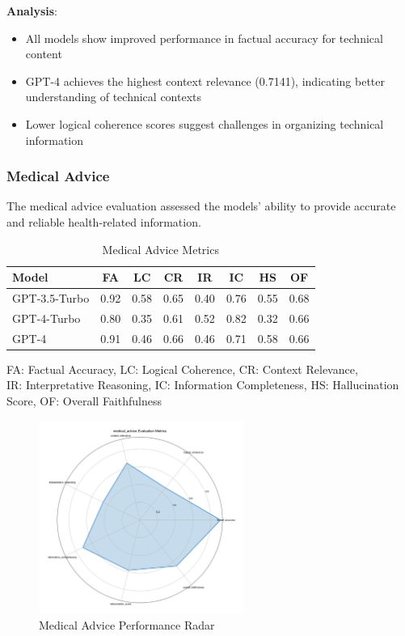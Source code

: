 \textbf{Analysis}:
\begin{itemize}
    \item All models show improved performance in factual accuracy for technical content
    \item GPT-4 achieves the highest context relevance (0.7141), indicating better understanding of technical contexts
    \item Lower logical coherence scores suggest challenges in organizing technical information
\end{itemize}

\subsubsection{Medical Advice}
The medical advice evaluation assessed the models' ability to provide accurate and reliable health-related information.

\begin{table}[!htbp]
\centering
\setlength{\tabcolsep}{4pt}  %
\begin{tabular}{|l|c|c|c|c|c|c|c|}
\hline
\textbf{Model} & \textbf{FA} & \textbf{LC} & \textbf{CR} & \textbf{IR} 
& \textbf{IC} & \textbf{HS} & \textbf{OF} \\
\hline
GPT-3.5-Turbo & 0.92 & 0.58 & 0.65 & 0.40 & 0.76 & 0.55 & 0.68 \\
GPT-4-Turbo & 0.80 & 0.35 & 0.61 & 0.52 & 0.82 & 0.32 & 0.66 \\
GPT-4 & 0.91 & 0.46 & 0.66 & 0.46 & 0.71 & 0.58 & 0.66 \\
\hline
\end{tabular}
\caption{Medical Advice Metrics}
\label{tab:results_medical_metrics}
\begin{flushleft}
\small
FA: Factual Accuracy, LC: Logical Coherence, CR: Context Relevance,\\
IR: Interpretative Reasoning, IC: Information Completeness, HS: Hallucination Score, OF: Overall Faithfulness
\end{flushleft}
\end{table}

\begin{figure}[!htbp]
\centering
\includegraphics[width=0.6\textwidth]{figures/types/medical_advice_radar_gpt-4.png}
\caption{Medical Advice Performance Radar}
\label{fig:medical_radar}
\end{figure}

